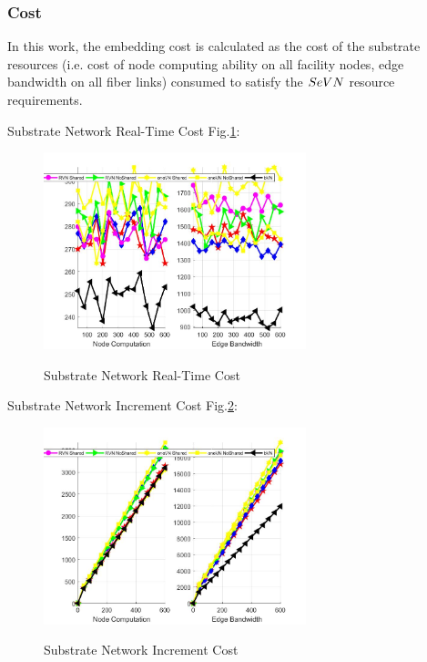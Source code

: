 \subsubsection{Cost}
In this work, the embedding cost is calculated as the cost of the substrate resources (i.e. cost of node computing ability on all facility nodes, edge bandwidth on all fiber links) consumed to satisfy the $SeVN$ resource requirements.

Substrate Network Real-Time Cost Fig.\ref{fig:CostCurrentSubstrateNetwork}:
\begin{figure}
  \centering
  \includegraphics[width=3in]{Fig/CostCurrentSubstrateNetwork}\\
  \caption{Substrate Network Real-Time Cost}\label{fig:CostCurrentSubstrateNetwork}
\end{figure}

Substrate Network Increment Cost Fig.\ref{fig:CostAccumulateSubstrateNetwork}:
\begin{figure}
  \centering
  \includegraphics[width=3in]{Fig/CostAccumulateSubstrateNetwork}\\
  \caption{Substrate Network Increment Cost}\label{fig:CostAccumulateSubstrateNetwork}
\end{figure}


